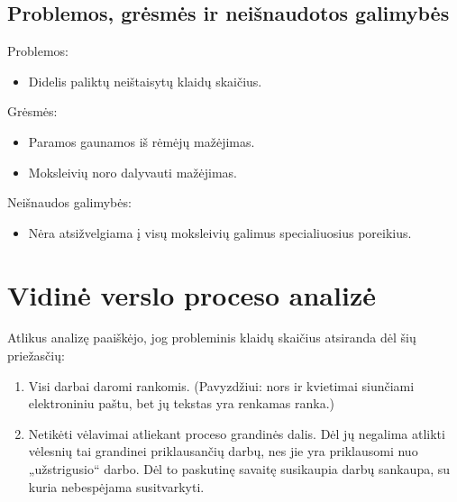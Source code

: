 \subsection{Problemos, grėsmės ir neišnaudotos galimybės}

Problemos:
\begin{itemize}
  \item Didelis paliktų neištaisytų klaidų skaičius.
\end{itemize}

Grėsmės:
\begin{itemize}
  \item Paramos gaunamos iš rėmėjų mažėjimas. 
  \item Moksleivių noro dalyvauti mažėjimas.
\end{itemize}

Neišnaudos galimybės:
\begin{itemize}
  \item Nėra atsižvelgiama į visų moksleivių galimus specialiuosius 
    poreikius.
\end{itemize}

\section{Vidinė verslo proceso analizė}

Atlikus analizę paaiškėjo, jog probleminis klaidų skaičius atsiranda dėl
šių priežasčių:
\begin{enumerate}
  \item Visi darbai daromi rankomis. (Pavyzdžiui: nors ir kvietimai
    siunčiami elektroniniu paštu, bet jų tekstas yra renkamas ranka.)
  \item Netikėti vėlavimai atliekant proceso grandinės dalis. Dėl jų 
    negalima atlikti vėlesnių tai grandinei priklausančių darbų, nes
    jie yra priklausomi nuo „užstrigusio“ darbo. Dėl to paskutinę 
    savaitę susikaupia
    darbų sankaupa, su kuria nebespėjama susitvarkyti.
\end{enumerate}

